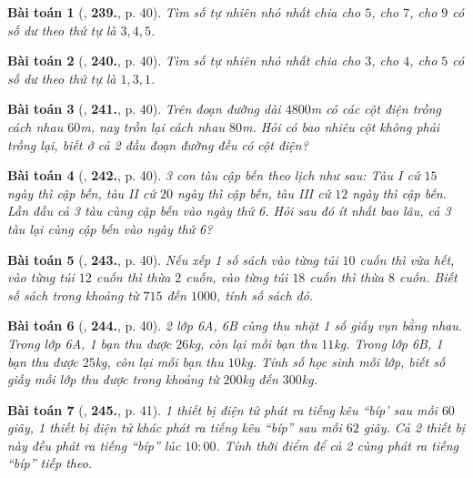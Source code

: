 \documentclass{article}
\numberwithin{equation}{section}
\newtheorem{baitoan}{Bài toán}[section]
\begin{document}
\begin{baitoan}[\cite{Binh_Toan_6_tap_1}, \textbf{239.}, p. 40]
	Tìm số tự nhiên nhỏ nhất chia cho $5$, cho $7$, cho $9$ có số dư theo thứ tự là $3,4,5$.
\end{baitoan}

\begin{baitoan}[\cite{Binh_Toan_6_tap_1}, \textbf{240.}, p. 40]
	Tìm số tự nhiên nhỏ nhất chia cho $3$, cho $4$, cho $5$ có số dư theo thứ tự là $1,3,1$.
\end{baitoan}

\begin{baitoan}[\cite{Binh_Toan_6_tap_1}, \textbf{241.}, p. 40]
	Trên đoạn đường dài $4800$\emph{m} có các cột điện trồng cách nhau $60$\emph{m}, nay trồn lại cách nhau $80$\emph{m}. Hỏi có bao nhiêu cột không phải trồng lại, biết ở cả 2 đầu đoạn đường đều có cột điện?
\end{baitoan}

\begin{baitoan}[\cite{Binh_Toan_6_tap_1}, \textbf{242.}, p. 40]
	3 con tàu cập bến theo lịch như sau: Tàu I cứ $15$ ngày thì cập bến, tàu II cứ $20$ ngày thì cập bến, tàu III cứ $12$ ngày thì cập bến. Lần đầu cả 3 tàu cùng cập bến vào ngày thứ 6. Hỏi sau đó ít nhất bao lâu, cả 3 tàu lại cùng cập bến vào ngày thứ 6?
\end{baitoan}

\begin{baitoan}[\cite{Binh_Toan_6_tap_1}, \textbf{243.}, p. 40]
	Nếu xếp 1 số sách vào từng túi $10$ cuốn thì vừa hết, vào từng túi $12$ cuốn thì thừa $2$ cuốn, vào từng túi $18$ cuốn thì thừa $8$ cuốn. Biết số sách trong khoảng từ $715$ đến $1000$, tính số sách đó.
\end{baitoan}

\begin{baitoan}[\cite{Binh_Toan_6_tap_1}, \textbf{244.}, p. 40]
	2 lớp 6A, 6B cùng thu nhặt 1 số giấy vụn bằng nhau. Trong lớp 6A, 1 bạn thu được $26$\emph{kg}, còn lại mỗi bạn thu $11$\emph{kg}. Trong lớp 6B, 1 bạn thu được $25$\emph{kg}, còn lại mỗi bạn thu $10$\emph{kg}. Tính số học sinh mỗi lớp, biết số giấy mỗi lớp thu được trong khoảng từ $200$\emph{kg} đến $300$\emph{kg}.
\end{baitoan}

\begin{baitoan}[\cite{Binh_Toan_6_tap_1}, \textbf{245.}, p. 41]
	1 thiết bị điện tử phát ra tiếng kêu ``bíp' sau mỗi $60$ giây, 1 thiết bị điện tử khác phát ra tiếng kêu ``bíp'' sau mỗi $62$ giây. Cả 2 thiết bị này đều phát ra tiếng ``bíp'' lúc $10:00$. Tính thời điểm để cả 2 cùng phát ra tiếng ``bíp'' tiếp theo.
\end{baitoan}
\end{document}

